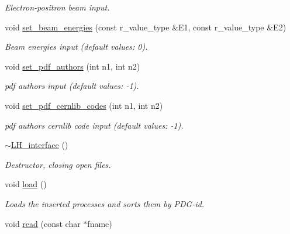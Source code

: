 \begin{DoxyCompactItemize}
\begin{DoxyCompactList}\small\item\em Electron-\/positron beam input. \end{DoxyCompactList}\item 
\hypertarget{a00322_a3e637e38356d8c83397d0301e7d98d30}{void \hyperlink{a00322_a3e637e38356d8c83397d0301e7d98d30}{set\-\_\-beam\-\_\-energies} (const r\-\_\-value\-\_\-type \&E1, const r\-\_\-value\-\_\-type \&E2)}\label{a00322_a3e637e38356d8c83397d0301e7d98d30}

\begin{DoxyCompactList}\small\item\em Beam energies input (default values\-: 0). \end{DoxyCompactList}\item 
\hypertarget{a00322_a3ea0390cb9cf9a577120a88a50487f32}{void \hyperlink{a00322_a3ea0390cb9cf9a577120a88a50487f32}{set\-\_\-pdf\-\_\-authors} (int n1, int n2)}\label{a00322_a3ea0390cb9cf9a577120a88a50487f32}

\begin{DoxyCompactList}\small\item\em pdf authors input (default values\-: -\/1). \end{DoxyCompactList}\item 
\hypertarget{a00322_a5f371b21240ffb0ea90a2d265dc15370}{void \hyperlink{a00322_a5f371b21240ffb0ea90a2d265dc15370}{set\-\_\-pdf\-\_\-cernlib\-\_\-codes} (int n1, int n2)}\label{a00322_a5f371b21240ffb0ea90a2d265dc15370}

\begin{DoxyCompactList}\small\item\em pdf authors cernlib code input (default values\-: -\/1). \end{DoxyCompactList}\item 
\hypertarget{a00322_ad54f6f0859e844f1c872def0d2ddfa1c}{\hyperlink{a00322_ad54f6f0859e844f1c872def0d2ddfa1c}{$\sim$\-L\-H\-\_\-interface} ()}\label{a00322_ad54f6f0859e844f1c872def0d2ddfa1c}

\begin{DoxyCompactList}\small\item\em Destructor, closing open files. \end{DoxyCompactList}\item 
\hypertarget{a00322_a07a634c0334ab3c2b61f212dc3f81bee}{void \hyperlink{a00322_a07a634c0334ab3c2b61f212dc3f81bee}{load} ()}\label{a00322_a07a634c0334ab3c2b61f212dc3f81bee}

\begin{DoxyCompactList}\small\item\em Loads the inserted processes and sorts them by P\-D\-G-\/id. \end{DoxyCompactList}\item 
\hypertarget{a00322_a47ab5ff8d75600e11b6117ce1da39079}{void \hyperlink{a00322_a47ab5ff8d75600e11b6117ce1da39079}{read} (const char $\ast$fname)}\label{a00322_a47ab5ff8d75600e11b6117ce1da39079}


\end{DoxyCompactItemize}
